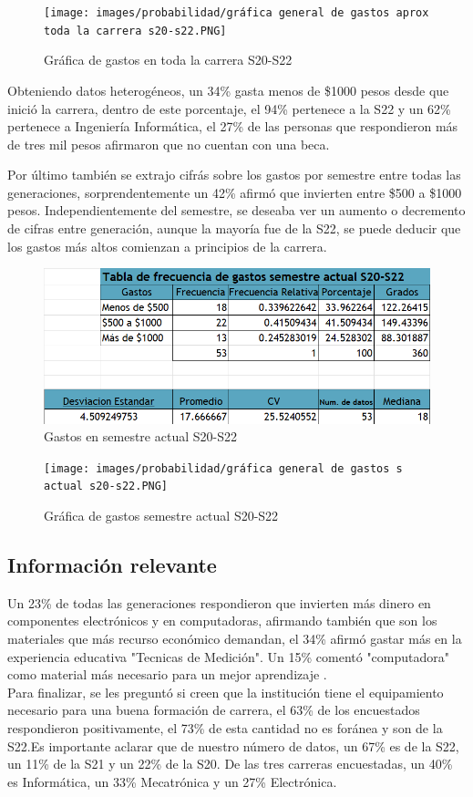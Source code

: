 \documentclass[letterpaper,12pt]{article}
\begin{document}
\begin{sloppypar}
\begin{figure}[H]
    \centering
    \texttt{[image: images/probabilidad/gráfica general de gastos aprox toda la carrera s20-s22.PNG]}
    \caption{Gráfica de gastos en toda la carrera S20-S22}
\end{figure}

Obteniendo datos heterogéneos, un 34\% gasta menos de \$1000 pesos desde que inició la carrera, dentro de este porcentaje, el 94\% pertenece a la S22 y un 62\% pertenece a Ingeniería Informática, el 27\% de las personas que respondieron más de tres mil pesos afirmaron que no cuentan con una beca.

Por último también se extrajo cifrás sobre los gastos por semestre entre todas las generaciones, sorprendentemente un 42\% afirmó que invierten entre \$500 a \$1000 pesos. Independientemente del semestre, se deseaba ver un aumento o decremento de cifras entre generación, aunque la mayoría fue de la S22, se puede deducir que los gastos más altos comienzan a principios de la carrera.

\begin{figure}[H]
    \centering
    \includegraphics[width=0.7 \textwidth]{images/probabilidad/Tabla de frecuencia general de gastos sem,actual s20-s22.PNG}
    \caption{Gastos en semestre actual S20-S22}
\end{figure}

\begin{figure}[H]
    \centering
    \texttt{[image: images/probabilidad/gráfica general de gastos s actual s20-s22.PNG]}
    \caption{Gráfica de gastos semestre actual S20-S22}
\end{figure}

\subsection*{Información relevante}
Un 23\% de todas las generaciones respondieron que invierten más dinero en componentes electrónicos y en computadoras, afirmando también que son los materiales que más recurso económico demandan, el 34\% afirmó gastar más en la experiencia educativa "Tecnicas de Medición".
Un 15\% comentó "computadora" como material más necesario para un mejor aprendizaje .
\vspace{0.3cm}\\
Para finalizar, se les preguntó si creen que la institución tiene el equipamiento necesario para una buena formación de carrera, el 63\% de los encuestados respondieron positivamente, el 73\% de esta cantidad no es foránea y son de la S22.Es importante aclarar que de nuestro número de datos, un 67\% es de la S22, un 11\% de la S21 y un 22\% de la S20. De las tres carreras encuestadas, un 40\% es Informática, un 33\% Mecatrónica y un 27\% Electrónica.




\end{sloppypar}
\end{document}
